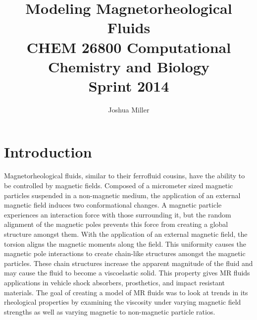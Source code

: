 

\title{Modeling Magnetorheological Fluids \\ {\small CHEM 26800 Computational Chemistry and Biology \\Sprint 2014}} 
\author{Joshua Miller}
\date{ }


\maketitle



\section*{Introduction}

Magnetorheological fluids, similar to their ferrofluid cousins, have
the ability to be controlled by magnetic fields. Composed of a
micrometer sized magnetic particles suspended in a non-magnetic
medium, the application of an external magnetic field induces two
conformational changes. A magnetic particle experiences an interaction
force with those surrounding it, but the random alignment of the
magnetic poles prevents this force from creating a global structure
amongst them. With the application of an external magnetic field, the
torsion aligns the magnetic moments along the field.  This uniformity
causes the magnetic pole interactions to create chain-like structures
amongst the magnetic particles. These chain structures increase the
apparent magnitude of the fluid and may cause the fluid to become a
viscoelastic solid.  This property gives MR fluids applications in
vehicle shock absorbers, prosthetics, and impact resistant
materials. The goal of creating a model of MR fluids was to look at
trends in its rheological properties by examining the viscosity under
varying magnetic field strengths as well as varying magnetic to
non-magnetic particle ratios.

